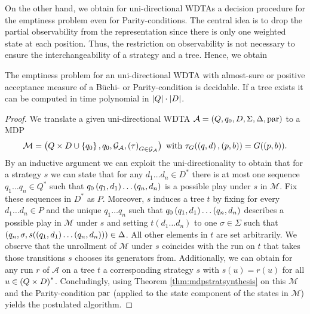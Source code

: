 On the other hand, we obtain for uni-directional \acp{WDTA} a decision 
procedure for the emptiness problem even for Parity-conditions. The central 
idea is to drop the partial observability from the representation since there
is only one weighted state at each position. Thus, the restriction on 
observability is not necessary to ensure the interchangeability of a strategy 
and a tree. Hence, we obtain
\begin{corollary}
  \cite[Corollary 47]{RandAutoInfTrees}
  The emptiness problem for an uni-directional \ac{WDTA} with almost-sure or
  positive acceptance measure of a Büchi- or Parity-condition is decidable.
  If a tree exists it can be computed in time polynomial in 
  $\left\vert{Q}\right\vert\cdot\left\vert{D}\right\vert$.
  \label{cor:unidirwdtaemptinessmdp}
\end{corollary}
\begin{proof}
  We translate a given uni-directional \ac{WDTA} 
  $\mathcal{A} = \left(Q, q_{0}, D, \Sigma, \Delta, \operatorname{par}\right)$ to a \ac{MDP}
  \begin{equation*}
    \mathcal{M} = \left(Q\times D\cup\left\{q_{0}\right\}, q_{0}, 
      \mathcal{G}_{\mathcal{A}}, \left(\tau\right)_{G\in\mathcal{G}_{\mathcal{A}}}\right)
    \text{ with }\tau_{G}(\left(q, d\right), \left(p, b\right)) = G(\left(p, b\right)).
  \end{equation*}
  By an inductive argument we can exploit the uni-directionality to obtain that
  for a strategy $s$ we can state that for any $d_{1}\dots d_{n}\in D^{*}$ 
  there is at most one sequence $q_{1}\dots q_{n}\in Q^{*}$ such that
  $q_{0}\left(q_{1}, d_{1}\right)\dots\left(q_{n}, d_{n}\right)$ is a possible play under 
  $s$ in $\mathcal{M}$. Fix these sequences in $D^{*}$ as $P$. Moreover, $s$ 
  induces a tree $t$ by fixing for every $d_{1}\dots d_{n}\in P$ and the
  unique $q_{1}\dots q_{n}$ such that 
  $q_{0}\left(q_{1}, d_{1}\right)\dots\left(q_{n}, d_{n}\right)$ describes a possible 
  play in $\mathcal{M}$ under $s$ and setting
  $t(d_{1}\dots d_{n})$ to one $\sigma\in\Sigma$ such that
  $\left(q_{n},\sigma, s(\left(q_{1}, d_{1}\right)\dots\left(q_{n}, d_{n}\right))\right)
    \in\Delta$. All other elements in $t$ are set arbitrarily. We observe that 
  the unrollment of $\mathcal{M}$ under $s$ coincides with the run on $t$ that 
  takes those transitions $s$ chooses its generators from. Additionally, we can
  obtain for any run $r$ of $\mathcal{A}$ on a tree $t$ a corresponding 
  strategy $s$ with $s(u) = r(u)$ for all $u\in \left(Q\times D\right)^{*}$. 
  Concludingly, using Theorem \ref{thm:mdpstratsynthesis} on this $\mathcal{M}$
  and the Parity-condition $\operatorname{par}$ (applied to the state component of the 
  states in $\mathcal{M}$) yields the postulated algorithm.
\end{proof}

